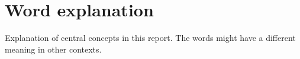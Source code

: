 
\newcommand{\wordexpl}[2]{%
	\textbf{#1}\hspace*{.2cm}#2\\
}

\chapter*{Word explanation}

\setlength\columnsep{25pt}
\begin{multicols}{2}
\noindent
Explanation of central concepts in this report. The words might have a different meaning in other contexts.
\vspace*{.1cm}


\end{multicols}
